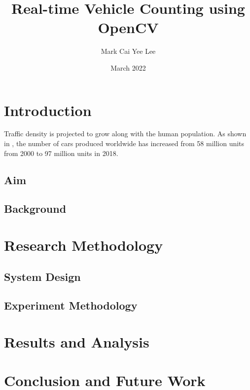 \documentclass[12pt,a4paper,fleqn]{report}
\title{Real-time Vehicle Counting using OpenCV}
\author{Mark Cai Yee Lee}
\date{March 2022}
\begin{document}
\maketitle

\chapter{Introduction}

Traffic density is projected to grow along with the human population. 
As shown in \cite{placek:2022}, the number of cars produced worldwide has increased from 58 million units from 2000 to 97 million units in 2018.


\section{Aim}
\section{Background}
\chapter{Research Methodology}

\section{System Design}

\section{Experiment Methodology}

\chapter{Results and Analysis}

\chapter{Conclusion and Future Work}




\end{document}
